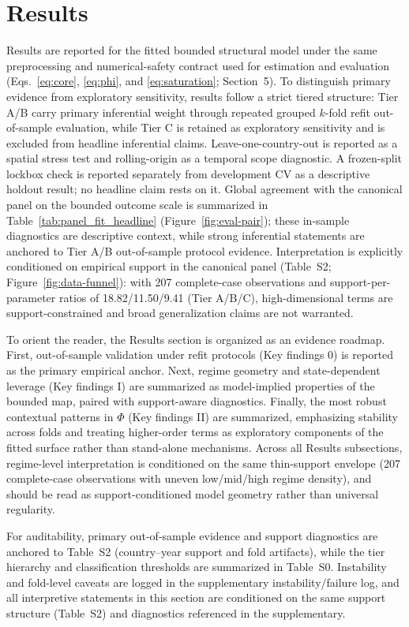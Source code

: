 \documentclass[11pt]{article}
\begin{document}
\section{Results}
Results are reported for the fitted bounded structural model under the same preprocessing and numerical-safety contract used for estimation and evaluation (Eqs.~\eqref{eq:core}, \eqref{eq:phi}, and \eqref{eq:saturation}; Section~5). To distinguish primary evidence from exploratory sensitivity, results follow a strict tiered structure: Tier A/B carry primary inferential weight through repeated grouped $k$-fold refit out-of-sample evaluation, while Tier C is retained as exploratory sensitivity and is excluded from headline inferential claims. Leave-one-country-out is reported as a spatial stress test and rolling-origin as a temporal scope diagnostic. A frozen-split lockbox check is reported separately from development CV as a descriptive holdout result; no headline claim rests on it. Global agreement with the canonical panel on the bounded outcome scale is summarized in Table~\ref{tab:panel_fit_headline} (Figure~\ref{fig:eval-pair}); these in-sample diagnostics are descriptive context, while strong inferential statements are anchored to Tier A/B out-of-sample protocol evidence. Interpretation is explicitly conditioned on empirical support in the canonical panel (Table~S2; Figure~\ref{fig:data-funnel}): with 207 complete-case observations and support-per-parameter ratios of 18.82/11.50/9.41 (Tier A/B/C), high-dimensional terms are support-constrained and broad generalization claims are not warranted.

To orient the reader, the Results section is organized as an evidence roadmap. First, out-of-sample validation under refit protocols (Key findings 0) is reported as the primary empirical anchor. Next, regime geometry and state-dependent leverage (Key findings I) are summarized as model-implied properties of the bounded map, paired with support-aware diagnostics. Finally, the most robust contextual patterns in $\Phi$ (Key findings II) are summarized, emphasizing stability across folds and treating higher-order terms as exploratory components of the fitted surface rather than stand-alone mechanisms.
Across all Results subsections, regime-level interpretation is conditioned on the same thin-support envelope (207 complete-case observations with uneven low/mid/high regime density), and should be read as support-conditioned model geometry rather than universal regularity.

For auditability, primary out-of-sample evidence and support diagnostics are anchored to Table~S2 (country--year support and fold artifacts), while the tier hierarchy and classification thresholds are summarized in Table~S0. Instability and fold-level caveats are logged in the supplementary instability/failure log, and all interpretive statements in this section are conditioned on the same support structure (Table~S2) and diagnostics referenced in the supplementary.
\end{document}
